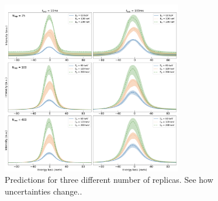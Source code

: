 \begin{figure}[H]
\centering
 \includegraphics[width=0.7\textwidth]{plots/Prediction_120keV_different_nrep.pdf}
 \caption{Predictions for three different number of replicas. 
 See how uncertainties change..}
\label{fig:EELS_vacuum_DeltaE_check3}
\end{figure}



